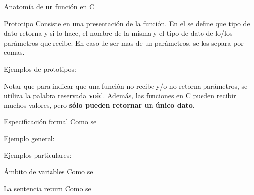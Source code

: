 \documentclass[xcolor=pdftex,table,11pt]{beamer}
\begin{document}
\begin{frame}[allowframebreaks]{Anatomía de un función en C}

\begin{block}{Prototipo}
Consiste en una presentación de la función. En el se define que tipo de dato retorna y si lo hace, el nombre de la misma y el tipo de dato de lo/los parámetros que recibe. En caso de ser mas de un parámetros, se los separa por comas.\\
\end{block}

Ejemplos de prototipos:
\codesetstylefrombeamer
{}


Notar que para indicar que una función no recibe y/o no retorna parámetros, se utiliza la palabra reservada \textbf{void}. Además, las funciones en C pueden recibir muchos valores, pero \textbf{sólo pueden retornar un único dato}.

\newpage

\begin{block}{Especificación formal}
Como se 
\end{block}

Ejemplo general:
\codesetstylefrombeamer
{}

Ejemplos particulares:

\begin{block}{Ámbito de variables}
Como se 
\end{block}

\begin{block}{La sentencia return}
Como se 
\end{block}

\end{frame}
\end{document}

